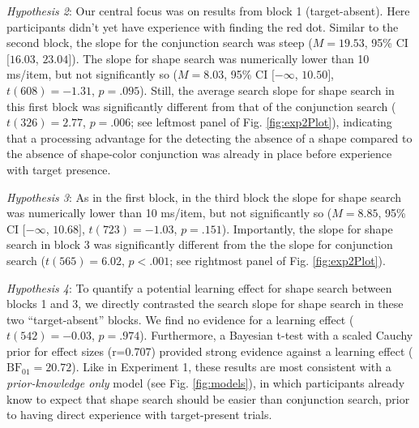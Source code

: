\documentclass[
  english,
  man]{apa6}
\begin{document}
\emph{Hypothesis 2}: Our central focus was on results from block 1 (target-absent). Here participants didn't yet have experience with finding the red dot. Similar to the second block, the slope for the conjunction search was steep (\(M = 19.53\), 95\% CI \([16.03\), \(23.04]\)). The slope for shape search was numerically lower than 10 ms/item, but not significantly so (\(M = 8.03\), 95\% CI \([-\infty\), \(10.50]\), \(t(608) = -1.31\), \(p = .095\)). Still, the average search slope for shape search in this first block was significantly different from that of the conjunction search (\(t(326) = 2.77\), \(p = .006\); see leftmost panel of Fig. \ref{fig:exp2Plot}), indicating that a processing advantage for the detecting the absence of a shape compared to the absence of shape-color conjunction was already in place before experience with target presence.

\emph{Hypothesis 3}: As in the first block, in the third block the slope for shape search was numerically lower than 10 ms/item, but not significantly so (\(M = 8.85\), 95\% CI \([-\infty\), \(10.68]\), \(t(723) = -1.03\), \(p = .151\)). Importantly, the slope for shape search in block 3 was significantly different from the the slope for conjunction search (\(t(565) = 6.02\), \(p < .001\); see rightmost panel of Fig. \ref{fig:exp2Plot}).

\emph{Hypothesis 4}: To quantify a potential learning effect for shape search between blocks 1 and 3, we directly contrasted the search slope for shape search in these two \enquote{target-absent} blocks. We find no evidence for a learning effect (\(t(542) = -0.03\), \(p = .974\)). Furthermore, a Bayesian t-test with a scaled Cauchy prior for effect sizes (r=0.707) provided strong evidence against a learning effect (\(\mathrm{BF}_{\textrm{01}} = 20.72\)). Like in Experiment 1, these results are most consistent with a \emph{prior-knowledge only} model (see Fig. \ref{fig:models}), in which participants already know to expect that shape search should be easier than conjunction search, prior to having direct experience with target-present trials.
\end{document}
